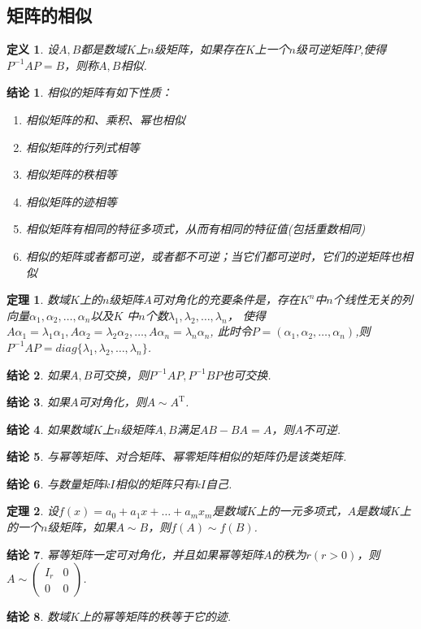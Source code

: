 \documentclass[UTF8]{article}
\newtheorem{thrm}{定理}[subsection]
\newtheorem{defn}{定义}[subsection]
\newtheorem{ccl}{结论}[subsection]
\begin{document}
\subsection{矩阵的相似}
\begin{defn}
  设$A,B$都是数域$K$上$n$级矩阵，如果存在$K$上一个$n$级可逆矩阵$P$,使得$P^{-1}AP=B$，则称$A,B$相似.
\end{defn}
\begin{ccl}
  相似的矩阵有如下性质：
  \begin{enumerate}
    \item 相似矩阵的和、乘积、幂也相似
    \item 相似矩阵的行列式相等
    \item 相似矩阵的秩相等
    \item 相似矩阵的迹相等
    \item 相似矩阵有相同的特征多项式，从而有相同的特征值(包括重数相同)
    \item 相似的矩阵或者都可逆，或者都不可逆；当它们都可逆时，它们的逆矩阵也相似
  \end{enumerate}
\end{ccl}
\begin{thrm}
  数域$K$上的$n$级矩阵$A$可对角化的充要条件是，存在$K^n$中$n$个线性无关的列向量$\alpha_1,\alpha_2,\ldots,\alpha_n$以及$K$
  中$n$个数$\lambda_1,\lambda_2,\ldots,\lambda_n$，
  使得$A\alpha_1=\lambda_1\alpha_1,A\alpha_2=\lambda_2\alpha_2,\ldots,A\alpha_n=\lambda_n\alpha_n$,
  此时令$P=(\alpha_1,\alpha_2,\ldots,\alpha_n)$,则$P^{-1}AP=diag\{\lambda_1,\lambda_2,\ldots,\lambda_n\}$.
\end{thrm}
\begin{ccl}
  如果$A,B$可交换，则$P^{-1}AP,P^{-1}BP$也可交换.
\end{ccl}
\begin{ccl}
  如果$A$可对角化，则$A\sim A^{\mathrm{T}}$.
\end{ccl}
\begin{ccl}
  如果数域$K$上$n$级矩阵$A,B$满足$AB-BA=A$，则$A$不可逆.
\end{ccl}
\begin{ccl}
  与幂等矩阵、对合矩阵、幂零矩阵相似的矩阵仍是该类矩阵.
\end{ccl}
\begin{ccl}
  与数量矩阵$kI$相似的矩阵只有$kI$自己.
\end{ccl}
\begin{thrm}
  设$f(x)=a_0+a_1x+\ldots+a_mx_m$是数域$K$上的一元多项式，$A$是数域$K$上的一个$n$级矩阵，如果$A\sim B$，则$f(A)\sim f(B)$.
\end{thrm}
\begin{ccl}
  幂等矩阵一定可对角化，并且如果幂等矩阵$A$的秩为$r(r>0)$，则$A\sim \begin{pmatrix}I_r&0\\0&0 \end{pmatrix}$.
\end{ccl}
\begin{ccl}
  数域$K$上的幂等矩阵的秩等于它的迹.
\end{ccl}
\end{document}
